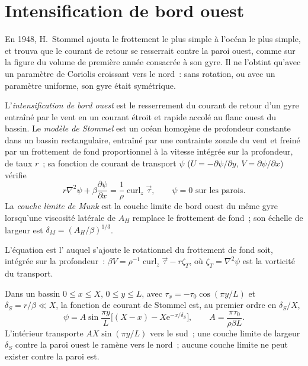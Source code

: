 \section{Intensification de bord ouest}\label{sec:b3:ocean-dynamics:western}

En 1948, H.~Stommel ajouta le frottement le plus simple à l'océan le plus simple, et
trouva que le courant de retour se resserrait contre la paroi ouest, comme sur la
figure du volume de première année consacrée à son gyre. Il ne l'obtint qu'avec un paramètre de Coriolis
croissant vers le nord~: sans rotation, ou avec un paramètre uniforme, son gyre
était symétrique.

\begin{definition}\label{def:b3:ocean-dynamics:western-intensification}
L'\emph{intensification de bord ouest} est le
resserrement du courant de retour d'un gyre entraîné par le vent en un courant étroit et rapide
accolé au flanc ouest du bassin. Le \emph{modèle de
Stommel} est un océan homogène de profondeur constante dans un
bassin rectangulaire, entraîné par une contrainte zonale du vent et freiné par un frottement
de fond proportionnel à la vitesse intégrée sur la profondeur, de taux $r$~;
sa fonction de courant de transport $\psi$ ($U = -\partial\psi/\partial y$, $V =
\partial\psi/\partial x$) vérifie
\[
r\nabla^2\psi + \beta\frac{\partial\psi}{\partial x} =
\frac{1}{\rho}\operatorname{curl}_z\vec\tau ,\qquad \psi = 0 \text{ sur les parois.}
\]
La \emph{couche limite de Munk} est la couche limite de bord ouest
du même gyre lorsqu'une viscosité latérale de  $A_H$
remplace le frottement de fond~; son échelle de largeur est $\delta_M =
(A_H/\beta)^{1/3}$.
\end{definition}

L'équation est l' auquel s'ajoute le rotationnel du frottement de fond
soit, intégrée sur la profondeur~: $\beta V = \rho^{-1}\operatorname{curl}_z
\vec\tau - r\zeta_T$, où $\zeta_T = \nabla^2\psi$ est la vorticité
du transport.

\begin{theorem}\label{thm:b3:ocean-dynamics:stommel}
Dans un bassin $0 \le x \le X$, $0 \le y \le L$, avec $\tau_x = -\tau_0
\cos(\pi y/L)$ et $\delta_S = r/\beta \ll X$, la fonction de courant de Stommel
est, au premier ordre en $\delta_S/X$,
\[
\psi = A\sin\frac{\pi y}{L}\Big[(X - x) - X\mathrm e^{-x/\delta_S}\Big],
\qquad A = \frac{\pi\tau_0}{\rho\beta L} .
\]
L'intérieur transporte $AX\sin(\pi y/L)$ vers le sud~; une couche limite de largeur
$\delta_S$ contre la paroi ouest le ramène vers le nord~; aucune couche limite ne peut
exister contre la paroi est.
\end{theorem}

